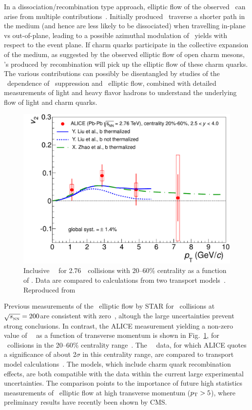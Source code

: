 In a dissociation/recombination type approach, elliptic flow of the observed \jpsi\ can 
arise from multiple contributions~\cite{ALICE:2013xna}. Initially produced \jpsi\ traverse a shorter path 
in the medium (and hence are less likely to be dissociated) when travelling in-plane vs 
out-of-plane, leading to a possible azimuthal modulation of \jpsi\ yields with respect 
to the event plane. If charm quarks participate in the collective expansion of the medium, as
suggested by the observed elliptic flow of open charm mesons, \jpsi's produced by recombination will
pick up the elliptic flow of these charm quarks. The various contributions can possibly be disentangled 
by studies of the \pT\ dependence of \jpsi\ suppression and \jpsi\ elliptic flow, combined with 
detailed measurements of light and heavy flavor hadrons to understand the underlying flow of 
light and charm quarks.

\begin{figure}
\begin{center}
\includegraphics[width=0.49\linewidth]{qqbarfigures/prl_fig4-eps-converted-to.pdf}
\caption{\label{fig:GR:v2ptcomp} Inclusive \jpsi\ \vtwo\
for 2.76\TeV\ \PbPb\ collisions with 20--60\% centrality as a function of \pT.
Data are compared to calculations from two transport models~\cite{Liu:2009gx,Zhao:2012gc}. 
Reproduced from~\cite{ALICE:2013xna}}
\end{center}
\end{figure}
Previous measurements of the \jpsi\ elliptic flow by STAR for \AuAu\ collisions at 
$\sqrt{s_{_{\rm NN}}} = 200$\GeV are consistent with zero~\cite{Adamczyk:2012pw}, 
altough the large uncertainties prevent strong conclusions.
In contrast, the ALICE measurement yielding a non-zero value of \jpsi\ \vtwo\ as a function 
of transverse momentum is shown in Fig.~\ref{fig:GR:v2ptcomp}, for \PbPb\ collisions in the 20--60\% 
centrality range~\cite{ALICE:2013xna}.
The \jpsi\ \vtwo\ data, for which ALICE quotes a significance of about 2$\sigma$ in this centrality range, 
are compared to transport model calculations~\cite{Liu:2009gx,Zhao:2012gc}. 
The models, which include charm quark recombination effects,
are both compatible with the data within the current large experimental uncertainties. 
The comparison points to the importance of future high statistics measurements 
of \jpsi\ elliptic flow at high transverse momentum ($\mbox{$p_{\mathrm{T}}$} > 5$\GeVc), where
preliminary results have recently been shown by CMS.

